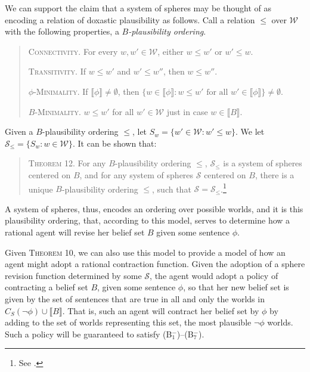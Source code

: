 We can support the claim that a system of spheres may be thought of as encoding a relation of doxastic plausibility as follows.
Call a relation $\leq$ over $\mathcal{W}$ with the following properties, a $B$\textit{-plausibility ordering}.
\begin{quote}
\textsc{Connectivity.}\; For every $w, w' \in \mathcal{W}$, either $w \leq w'$ or $w' \leq w$.

\textsc{Transitivity.}\; If $w \leq w'$ and $w' \leq w''$, then $w \leq w''$.

\textsc{$\phi$-Minimality.}\; If $\llbracket \phi \rrbracket \neq \emptyset$, then $\{w \in \llbracket \phi \rrbracket: w \leq w' \text{ for all } w' \in  \llbracket \phi \rrbracket \} \neq \emptyset$.

\textsc{$B$-Minimality.}\; $w \leq w'$ for all $w' \in \mathcal{W}$ just in case $w \in \llbracket B \rrbracket$.
\end{quote}

Given a  $B$-plausibility ordering $\leq$, let $S_w = \{w' \in \mathcal{W}: w' \leq w \}$.
We let $\mathcal{S}_{\leq} = \{S_w: w \in \mathcal{W} \}$.
It can be shown that:
\begin{quote}
\textsc{Theorem 12.}\; For any $B$-plausibility ordering $\leq$, $\mathcal{S}_{\leq}$ is a system of spheres centered on $B$, and for any system of spheres $\mathcal{S}$ centered on $B$, there is a unique $B$-plausibility ordering $\leq$, such that $\mathcal{S} = \mathcal{S}_{\leq}$.\footnote{See \citet{Gardenfors1}.}
\end{quote}

A system of spheres, thus, encodes an ordering over possible worlds, and it is this plausibility ordering, that, according to this model, serves to determine how a rational agent will revise her belief set $B$ given some sentence $\phi$.

Given \textsc{Theorem 10}, we can also use this model to provide a model of how  an agent might adopt a rational contraction function.
Given the adoption of a sphere revision function determined by some $\mathcal{S}$, the agent would adopt a policy of contracting a belief set $B$, given some sentence $\phi$, so that her new belief set is given by the set of sentences that are true in all and only the worlds in $C_S(\lnot \phi) \cup \llbracket B \rrbracket$.
That is, such an agent will contract her belief set by $\phi$ by adding to the set of worlds representing this set, the most plausible $\lnot \phi$ worlds.
Such a policy will be guaranteed to satisfy (B$^-_1$)--(B$^-_7$).


